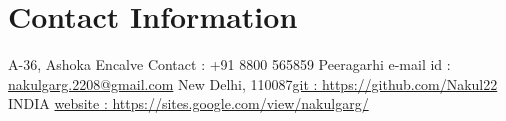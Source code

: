 \newenvironment{outerlist}[1][\enskip\textbullet]%
        {\begin{itemize}[#1,leftmargin=*]}{\end{itemize}%
         \vspace{-.6\baselineskip}}

\newenvironment{lonelist}[1][\enskip\textbullet]%
        {\begin{list}{#1}{%
        \setlength{\partopsep}{0pt}%
        \setlength{\topsep}{0pt}}}
        {\end{list}\vspace{-.6\baselineskip}}

\newenvironment{innerlist}[1][\enskip\textbullet]%
        {\begin{itemize}[#1,leftmargin=*,parsep=0pt,itemsep=0pt,topsep=0pt,partopsep=0pt]}
        {\end{itemize}}

\newenvironment{loneinnerlist}[1][\enskip\textbullet]%
        {\begin{itemize}[#1,leftmargin=*,parsep=0pt,itemsep=0pt,topsep=0pt,partopsep=0pt]}
        {\end{itemize}\vspace{-.6\baselineskip}}

\newcommand{\blankline}{\quad\pagebreak[3]}
\newcommand{\halfblankline}{\quad\vspace{-0.5\baselineskip}\pagebreak[3]}

\newcommand\doilink[1]{\href{http://dx.doi.org/#1}{#1}}
\newcommand\doi[1]{doi:\doilink{#1}}

\providecommand*\url[1]{\href{#1}{#1}}
\renewcommand*\url[1]{\href{#1}{\texttt{#1}}}
\providecommand*\email[1]{\href{mailto:#1}{#1}}

\providecommand\BibTeX{{B\kern-.05em{\sc i\kern-.025em b}\kern-.08em
    \TeX}}
\providecommand\Matlab{\textsc{Matlab}}




\section{Contact Information}

\newlength{\rcollength}\setlength{\rcollength}{1.4in}%


A-36, Ashoka Encalve  \hfill {Contact : +91 8800 565859} \newline
Peeragarhi \hfill {e-mail id : \email{nakulgarg.2208@gmail.com}} \newline
New Delhi, 110087\hfill  \href{https://github.com/Nakul22}{git : https://github.com/Nakul22} \newline
INDIA \hfill \href{https://sites.google.com/view/nakulgarg/}{website : https://sites.google.com/view/nakulgarg/}



